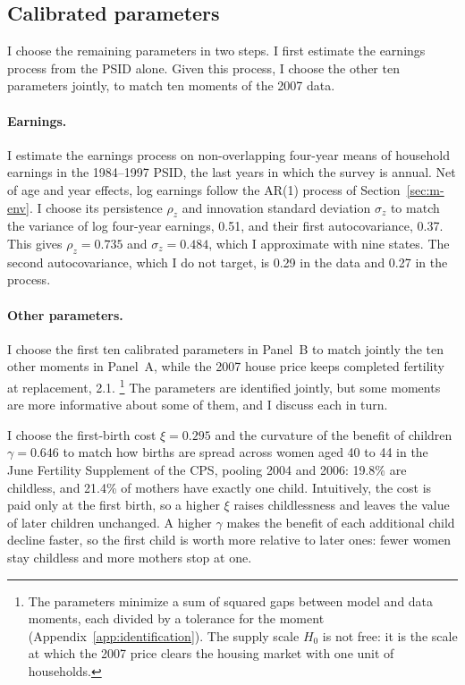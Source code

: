 \subsection{Calibrated parameters}
\label{sec:quant-identification}

I choose the remaining parameters in two steps. I first estimate the
earnings process from the PSID alone. Given this process, I choose the other
ten parameters jointly, to match ten moments of the 2007 data.

\paragraph{Earnings.}
I estimate the earnings process on non-overlapping four-year means of
household earnings in the 1984--1997 PSID, the last years in which the
survey is annual. Net of age and year effects, log earnings follow the
AR(1) process of Section~\ref{sec:m-env}. I choose its persistence $\rho_z$
and innovation standard deviation $\sigma_z$ to match the variance of log
four-year earnings, 0.51, and their first autocovariance, 0.37. This gives
$\rho_z=0.735$ and $\sigma_z=0.484$, which I approximate with nine states.
The second autocovariance, which I do not target, is 0.29 in the data and
0.27 in the process.

\paragraph{Other parameters.}
I choose the first ten calibrated parameters in Panel~B to match jointly the
ten other moments in Panel~A, while the 2007 house price keeps completed
fertility at replacement, 2.1.%
\footnote{The parameters minimize a sum of squared gaps between model and
data moments, each divided by a tolerance for the moment
(Appendix~\ref{app:identification}). The supply scale $H_0$ is not free: it
is the scale at which the 2007 price clears the housing market with one unit
of households.}
The parameters are identified jointly, but some moments are more informative
about some of them, and I discuss each in turn.

I choose the first-birth cost $\xi=0.295$ and the curvature of the benefit
of children $\gamma=0.646$ to match how births are spread across women aged
40 to 44 in the June Fertility Supplement of the CPS, pooling 2004 and 2006:
19.8\% are childless, and 21.4\% of mothers have exactly one child.
Intuitively, the cost is paid only at the first birth, so a higher $\xi$
raises childlessness and leaves the value of later children unchanged. A
higher $\gamma$ makes the benefit of each additional child decline faster,
so the first child is worth more relative to later ones: fewer women stay
childless and more mothers stop at one.

